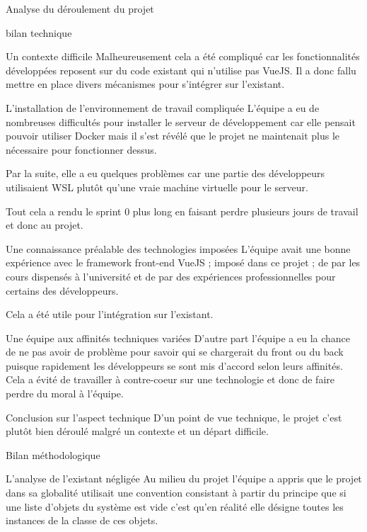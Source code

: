 \documentclass[]{article}
\begin{document}
{\begin{section}{Analyse du déroulement du projet}
\begin{subsection}{bilan technique}
\begin{subsubsection}{Un contexte difficile}
         Malheureusement cela a été compliqué car les fonctionnalités développées reposent sur du code existant qui n'utilise pas VueJS. Il a donc fallu mettre en place divers mécanismes pour s'intégrer sur l'existant.
     \end{subsubsection}

     \begin{subsubsection}{L'installation de l'environnement de travail compliquée}
         L'équipe a eu de nombreuses difficultés pour installer le serveur de développement car elle pensait pouvoir utiliser Docker mais il s'est révélé que le projet ne maintenait plus le nécessaire pour fonctionner dessus.

         Par la suite, elle a eu quelques problèmes car une partie des développeurs utilisaient WSL plutôt qu'une vraie machine virtuelle pour le serveur.

         Tout cela a rendu le sprint 0 plus long en faisant perdre plusieurs jours de travail et donc au projet.
     \end{subsubsection}

     \begin{subsubsection}{Une connaissance préalable des technologies imposées }
         L'équipe avait une bonne expérience avec le framework front-end VueJS ; imposé dans ce projet ; de par les cours dispensés à l'université et de par des expériences professionnelles pour certains des développeurs.

         Cela a été utile pour l'intégration sur l'existant.
     \end{subsubsection}

     \begin{subsubsection}{Une équipe aux affinités techniques variées }
         D'autre part l'équipe a eu la chance de ne pas avoir de problème pour savoir qui se chargerait du front ou du back puisque rapidement les développeurs se sont mis d'accord selon leurs affinités. Cela a évité de travailler à contre-coeur sur une technologie et donc de faire perdre du moral à l'équipe.
     \end{subsubsection}

     \begin{subsubsection}{Conclusion sur l'aspect technique}
        D'un point de vue technique, le projet c'est plutôt bien déroulé malgré un contexte et un départ difficile.
     \end{subsubsection}
 \end{subsection}

 \begin{subsection}{Bilan méthodologique}
     \begin{subsubsection}{L'analyse de l'existant négligée}
         Au milieu du projet l'équipe a appris que le projet dans sa globalité utilisait une convention consistant à partir du principe que si une liste d'objets du système est vide c'est qu'en réalité elle désigne toutes les instances de la classe de ces objets.


\end{subsubsection}
\end{subsection}
\end{section}}
\end{document}
